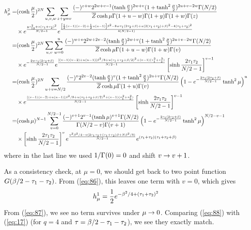\documentclass[11pt]{article}
\renewcommand{\>}{\rangle}
\newcommand{\<}{\langle}
\begin{document}
\begin{align}
h_{\mu}^{2}= & (\cosh\frac{\mu}{2})^{2N}\sum_{u,v,w}\sum_{z+y=v}\frac{(-)^{z+w}2^{2w+v-1}(\tanh\frac{\mu}{2})^{2w+v}(1+\tanh^{2}\frac{\mu}{2})^{2u+v-2w}\Gamma(N/2)}{\overline{Z}\cosh\mu\Gamma(1+u-w)\Gamma(1+y)\Gamma(1+w)\Gamma(z)}\nonumber \\
 & \times e^{\frac{y\tau_{12}^{2}+z(\tau_{1}+\tau_{2})^{2}}{N/2-1}} e^{\frac{\left[\frac{1}{2}(v-1)(v-2)+\frac{1}{2}u(u-1)\right]\beta^{2}-8w\tau_{1}(2\tau_{2}+\beta)+u(2(\tau_{1}+\tau_{2})+\beta)^{2}-4(\tau_{1}+\tau_{2})^{2}}{4(N/2-1)}}\nonumber \\
= & (\cosh\frac{\mu}{2})^{2N}\sum_{u,v}\sum_{w=0}^{u}\frac{(-)^{w+v}2^{2w+2v-2}(\tanh\frac{\mu}{2})^{2w+v}(1+\tanh^{2}\frac{\mu}{2})^{2u+v-2w}\Gamma(N/2)}{\overline{Z}\cosh\mu\Gamma(1+u-w)\Gamma(1+w)\Gamma(v)}\nonumber \\
 & \times e^{-\frac{2w\tau_{1}(2\tau_{2}+\beta)}{N/2-1}} e^{\frac{\left[(v-1)(v-2)+u(u-1)\right]\beta^{2}/8+u(\tau_{1}+\tau_{2}+\beta/2)^{2}+(v-1)(\tau_{1}^{2}+\tau_{2}^{2})}{N/2-1}} \left[\sinh\frac{2\tau_{1}\tau_{2}}{N/2-1}\right]^{v-1}\nonumber \\
= & (\cosh\frac{\mu}{2})^{2N}\sum_{u+v=N/2}\frac{(-)^{v}2^{2v-2}(\tanh\frac{\mu}{2})^{v}(1+\tanh^{2}\frac{\mu}{2})^{2u+v}\Gamma(N/2)}{\overline{Z}\cosh\mu\Gamma(1+u)\Gamma(v)}\left(1-e^{-\frac{2\tau_{1}(2\tau_{2}+\beta)}{N/2-1}}\tanh^{2}\mu\right)^{u}\nonumber \\
 & \times e^{\frac{\left[(v-1)(v-2)+u(u-1)\right]\beta^{2}/8+u(\tau_{1}+\tau_{2}+\beta/2)^{2}+(v-1)(\tau_{1}^{2}+\tau_{2}^{2})}{N/2-1}}\left[\sinh\frac{2\tau_{1}\tau_{2}}{N/2-1}\right]^{v-1}\nonumber \\
= & (\cosh\mu)^{N-1}\sum_{v=0}^{N/2-1}\frac{(-)^{v+1}2^{v-1}(\tanh\mu)^{v+1}\Gamma(N/2)}{\Gamma(N/2-v)\Gamma(v+1)}\left(1-e^{-\frac{2\tau_{1}(2\tau_{2}+\beta)}{N/2-1}}\tanh^{2}\mu\right)^{N/2-v-1}\nonumber \\
 & \times \left[\sinh\frac{2\tau_{1}\tau_{2}}{N/2-1}\right]^{v} e^{\frac{v^{2}\beta^{2}/4-v(2\tau_{1}\tau_{2}+(\tau_{1}+\tau_{2})\beta+N\beta^{2}/8)}{N/2-1}}e^{(\tau_{1}+\tau_{2})(\tau_{1}+\tau_{2}+\beta)}\label{eq:87}
\end{align}
where in the last line we used $1/\Gamma(0)=0$ and shift $v\rightarrow v+1$. 

As a consistency check, at $\mu=0$, we should get back to two point
function $G(\beta/2-\tau_{1}-\tau_{2})$. From (\ref{eq:86}), this leaves
one term with $v=0$, which gives
\begin{equation}
h_{\mu}^{1}=\frac{1}{2}e^{-\beta^{2}/4+(\tau_{1}+\tau_{2})^{2}}\label{eq:88}
\end{equation}
From (\ref{eq:87}), we see no term survives under $\mu\rightarrow0$. Comparing
(\ref{eq:88}) with (\ref{eq:17}) (for $q=4$ and $\tau=\beta/2-\tau_{1}-\tau_{2}$),
we see they exactly match. 
\end{document}

